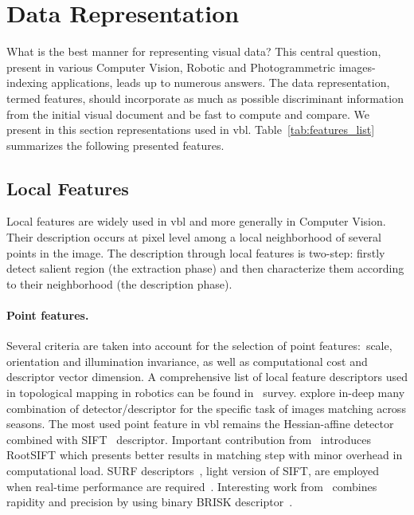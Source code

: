 \section{Data Representation}
\label{sec:image_representation}
	What is the best manner for representing visual data? This central question, present in various Computer Vision, Robotic and Photogrammetric images-indexing applications, leads up to numerous answers. The data representation, termed features, should incorporate as much as possible discriminant information from the initial visual document and be fast to compute and compare. We present in this section representations used in \ac{vbl}. Table~\ref{tab:features_list} summarizes the following presented features.
		
	\subsection{Local Features}
	\label{subsec:local_feature}
		Local features are widely used in \ac{vbl} and more generally in Computer Vision. Their description occurs at pixel level among a local neighborhood of several points in the image. The description through local features is two-step: firstly detect salient region (the extraction phase) and then characterize them according to their neighborhood (the description phase).
				
		\paragraph{Point features.} 
			Several criteria are taken into account for the selection of point features:~scale, orientation and illumination invariance, as well as computational cost and descriptor vector dimension. A comprehensive list of local feature descriptors used in topological mapping in robotics can be found in~\citet{Garcia-Fidalgo2015} survey. \citet{Krajnik2017a} explore in-deep many combination of detector/descriptor for the specific task of images matching across seasons. The most used point feature in \ac{vbl} remains the Hessian-affine detector~\citep{Mikolajczyk2004} combined with SIFT~\citep{Lowe2004} descriptor. Important contribution from~\citet{Arandjelovic2012} introduces RootSIFT which presents better results in matching step with minor overhead in computational load. SURF descriptors~\citep{Bay2006}, light version of SIFT, are employed when real-time performance are required~\citep{Cummins2008,Qu2016,Stumm2016}. Interesting work from~\citet{Feng2016a} combines rapidity and precision by using binary BRISK descriptor~\citep{Leutenegger2011brisk}.
        
